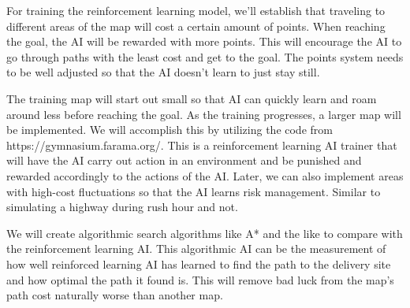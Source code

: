 \documentclass[conference]{IEEEtran}
\begin{document}
For training the reinforcement learning model, we'll establish that traveling to different areas of the map will cost a certain amount of points. When reaching the goal, the AI will be rewarded with more points. This will encourage the AI to go through paths with the least cost and get to the goal. The points system needs to be well adjusted so that the AI doesn't learn to just stay still.

The training map will start out small so that AI can quickly learn and roam around less before reaching the goal. As the training progresses, a larger map will be implemented. We will accomplish this by utilizing the code from https://gymnasium.farama.org/. This is a reinforcement learning AI trainer that will have the AI carry out action in an environment and be punished and rewarded accordingly to the actions of the AI. Later, we can also implement areas with high-cost fluctuations so that the AI learns risk management. Similar to simulating a highway during rush hour and not.

We will create algorithmic search algorithms like A* and the like to compare with the reinforcement learning AI. This algorithmic AI can be the measurement of how well reinforced learning AI has learned to find the path to the delivery site and how optimal the path it found is. This will remove bad luck from the map's path cost naturally worse than another map.





\end{document}
